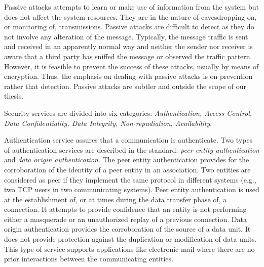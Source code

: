 	Passive attacks attempts to learn or make use of information from the system but does not affect the system resources.
	They are in the nature of eavesdropping on, or monitoring of, transmissions.
	Passive attacks are difficult to detect as they do not involve any alteration of the message.
	Typically, the message traffic is sent and received in an apparently normal way and neither the sender nor receiver is aware that a third party has sniffed the message or observed the traffic pattern.
	However, it is feasible to prevent the success of these attacks, usually by means of encryption. 
	Thus, the emphasis on dealing with passive attacks is on prevention rather that detection.
	Passive attacks are subtler and outside the scope of our thesis.

	Security services are divided into six categories:
	\textit{Authentication, Access Control, Data Confidentiality, Data Integrity, Non-repudiation, Availability}.
	
	Authentication service assures that a communication is authenticate.
	Two types of authentication services are described in the standard: \textit{peer entity authentication} and \textit{data origin authentication}.
	The peer entity authentication provides for the corroboration of the identity of a peer entity in an association.
	Two entities are considered as peer if they implement the same protocol in different systems (e.g., two TCP users in two communicating systems).
	Peer entity authentication is used at the establishment of, or at times during the data transfer phase of, a connection.
	It attempts to provide confidence that an entity is not performing either a masquerade or an unauthorized replay of a previous connection.
	Data origin authentication provides the corroboration of the source of a data unit. 
	It does not provide protection against the duplication or modification of data units.
	This type of service supports applications like electronic mail where there are no prior interactions between the communicating entities.
	
